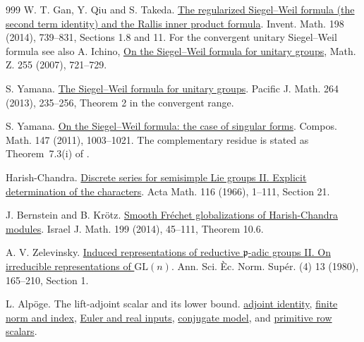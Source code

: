 \documentclass[11pt]{article}
\theoremstyle{definition}
\theoremstyle{plain}
\begin{document}
\begin{thebibliography}{999}
 W. T. Gan, Y. Qiu and S. Takeda.
\href{https://arxiv.org/pdf/1207.4709}{The regularized Siegel--Weil formula
(the second term identity) and the Rallis inner product formula}.
Invent. Math. 198 (2014), 739--831, Sections 1.8 and 11.
For the convergent unitary Siegel--Weil formula see also
A. Ichino, \href{https://doi.org/10.1007/s00209-006-0045-8}{On the
Siegel--Weil formula for unitary groups}, Math. Z. 255 (2007), 721--729.

 S. Yamana.
\href{https://doi.org/10.2140/pjm.2013.264.235}{The Siegel--Weil formula
for unitary groups}. Pacific J. Math. 264 (2013), 235--256,
Theorem 2 in the convergent range.

 S. Yamana.
\href{https://doi.org/10.1112/S0010437X11005379}{On the Siegel--Weil
formula: the case of singular forms}. Compos. Math. 147
(2011), 1003--1021. The complementary residue is stated as
Theorem~7.3(i) of \cite{gqt-rallis}.

 Harish-Chandra.
\href{https://doi.org/10.1007/BF02392813}{Discrete series for semisimple
Lie groups II. Explicit determination of the characters}.
Acta Math. 116 (1966), 1--111, Section 21.

 J. Bernstein and B. Kr\"otz.
\href{https://www.math.tau.ac.il/~bernstei/Publication_list/publication_texts/Bern-Kroetz-2014.pdf}{Smooth Fr\'echet globalizations of Harish-Chandra modules}.
Israel J. Math. 199 (2014), 45--111, Theorem 10.6.

 A. V. Zelevinsky.
\href{https://archive.numdam.org/item/10.24033/asens.1379.pdf}{Induced representations of reductive \(\mathfrak p\)-adic groups II. On irreducible representations of \(\mathrm{GL}(n)\)}.
Ann. Sci. \`Ec. Norm. Sup\'er. (4) 13 (1980), 165--210, Section 1.

 L. Alp\"oge. The lift-adjoint scalar and its lower bound.
\href{https://github.com/TomasOrtega/RH/blob/a6ac91a412dcbaab31801355ec5707024a71bf65/extracted/lean/src/Development/AbelianVarietyTheory/Proofs/DivisorProofs/AdelCOfInnerProductFormula.lean\#L214}{adjoint identity},
\href{https://github.com/TomasOrtega/RH/blob/a6ac91a412dcbaab31801355ec5707024a71bf65/extracted/lean/src/Development/AbelianVarietyTheory/Proofs/TwistedOperators/ThetaLevelIndexMulSchwartzNormFormula.lean\#L24}{finite norm and index},
\href{https://github.com/TomasOrtega/RH/blob/a6ac91a412dcbaab31801355ec5707024a71bf65/extracted/lean/src/Development/AbelianVarietyTheory/Proofs/DivisorProofs/FinitenessInputsRealData.lean}{Euler and real inputs},
\href{https://github.com/TomasOrtega/RH/blob/a6ac91a412dcbaab31801355ec5707024a71bf65/extracted/lean/src/Development/AbelianVarietyTheory/Proofs/DivisorProofs/RationalLiftLowerBoundOffBasePlace.lean\#L196}{conjugate model}, and
\href{https://github.com/TomasOrtega/RH/blob/a6ac91a412dcbaab31801355ec5707024a71bf65/extracted/lean/src/Development/AbelianVarietyTheory/Proofs/DivisorProofs/LiftEigenvalueLowerBoundOfWeakCharacterisation.lean}{primitive row scalars}.


\end{thebibliography}
\end{document}

